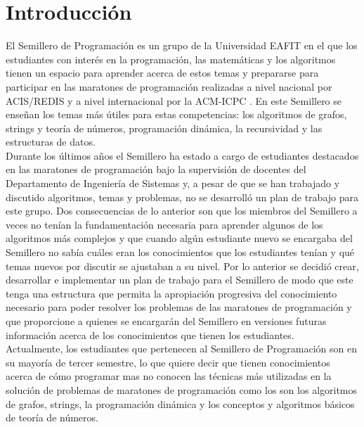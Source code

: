 \documentclass[conference]{IEEEtran}
\begin{document}
\section{Introducción}
El Semillero de Programación es un grupo de la Universidad EAFIT en el que los estudiantes con interés en la programación, las matemáticas y los algoritmos tienen un espacio para aprender acerca de estos temas y prepararse para participar en las maratones de programación realizadas a nivel nacional por ACIS/REDIS \cite{ACIS} y a nivel internacional por la ACM-ICPC \cite{ICPC}. En este Semillero se enseñan los temas más útiles \cite{Halim, Halim2, ProgrammingChallenges, Brasil} para estas competencias: los algoritmos de grafos, strings y teoría de números, programación dinámica, la recursividad y las estructuras de datos.\\
Durante los últimos años el Semillero ha estado a cargo de estudiantes destacados en las maratones de programación bajo la supervisión de docentes del Departamento de Ingeniería de Sistemas y, a pesar de que se han trabajado y discutido algoritmos, temas y problemas, no se desarrolló un plan de trabajo para este grupo. Dos consecuencias de lo anterior son que los miembros del Semillero a veces no tenían la fundamentación necesaria para aprender algunos de los algoritmos más complejos y que cuando algún estudiante nuevo se encargaba del Semillero no sabía cuáles eran los conocimientos que los estudiantes tenían y qué temas nuevos por discutir se ajustaban a su nivel. Por lo anterior se decidió crear, desarrollar e implementar un plan de trabajo para el Semillero de modo que este tenga una estructura que permita la apropiación progresiva del conocimiento necesario para poder resolver los problemas de las maratones de programación y que proporcione a quienes se encargarán del Semillero en versiones futuras información acerca de los conocimientos que tienen los estudiantes.\\
Actualmente, los estudiantes que pertenecen al Semillero de Programación son en su mayoría de tercer semestre, lo que quiere decir que tienen conocimientos acerca de cómo programar mas no conocen las técnicas más utilizadas en la solución de problemas de maratones de programación como los son los algoritmos de grafos, strings, la programación dinámica y los conceptos y algoritmos básicos de teoría de números.\\ %
\end{document}
